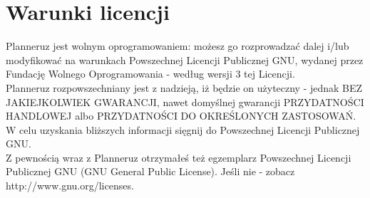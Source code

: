 \documentclass[a4paper,11pt]{uzreport}
\begin{document}
\section{Warunki licencji}

    Planneruz jest wolnym oprogramowaniem: możesz go rozprowadzać dalej
    i/lub modyfikować na warunkach Powszechnej Licencji Publicznej GNU,
    wydanej przez Fundację Wolnego Oprogramowania - według wersji 3 tej
    Licencji.\\

    Planneruz rozpowszechniany jest z nadzieją, iż będzie on
    użyteczny - jednak BEZ JAKIEJKOLWIEK GWARANCJI, nawet domyślnej
    gwarancji PRZYDATNOŚCI HANDLOWEJ albo PRZYDATNOŚCI DO OKREŚLONYCH
    ZASTOSOWAŃ. W celu uzyskania bliższych informacji sięgnij do Powszechnej Licencji Publicznej GNU.\\

    Z pewnością wraz z Planneruz otrzymałeś też egzemplarz
    Powszechnej Licencji Publicznej GNU (GNU General Public License).
    Jeśli nie - zobacz http://www.gnu.org/licenses.\\
\end{document}
